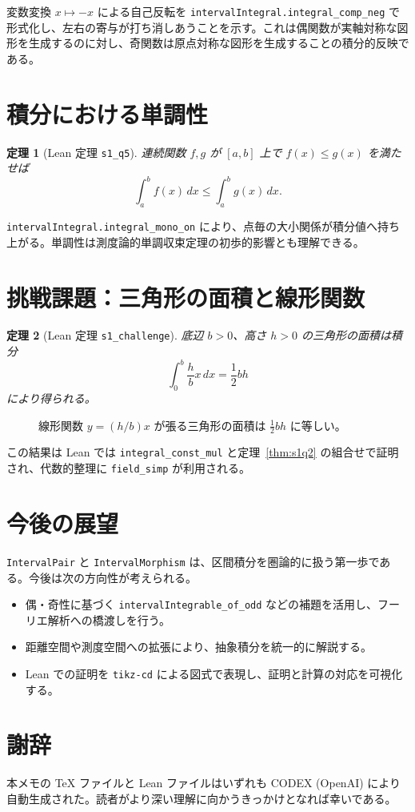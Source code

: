\documentclass[luatex]{ltjsarticle}
\theoremstyle{definition}
\theoremstyle{plain}
\newtheorem{theorem}{定理}
\theoremstyle{remark}
\begin{document}
変数変換 \(x\mapsto -x\) による自己反転を \verb|intervalIntegral.integral_comp_neg| で形式化し、左右の寄与が打ち消しあうことを示す。これは偶関数が実軸対称な図形を生成するのに対し、奇関数は原点対称な図形を生成することの積分的反映である。

\section{積分における単調性}
\begin{theorem}[Lean 定理 \texttt{s1\_q5}]
\label{thm:s1q5}
連続関数 \(f,g\) が \([a,b]\) 上で \(f(x)\le g(x)\) を満たせば
\[
\int_a^b f(x)\,dx \le \int_a^b g(x)\,dx.
\]
\end{theorem}

\verb|intervalIntegral.integral_mono_on| により、点毎の大小関係が積分値へ持ち上がる。単調性は測度論的単調収束定理の初歩的影響とも理解できる。

\section{挑戦課題：三角形の面積と線形関数}
\begin{theorem}[Lean 定理 \texttt{s1\_challenge}]
\label{thm:challenge}
底辺 \(b>0\)、高さ \(h>0\) の三角形の面積は積分
\[
\int_{0}^{b} \frac{h}{b}x\,dx = \frac{1}{2} b h
\]
により得られる。
\end{theorem}

\begin{figure}[h]
\centering
{}
\caption{線形関数 \(y=(h/b)x\) が張る三角形の面積は \(\tfrac{1}{2}bh\) に等しい。}
\end{figure}

この結果は Lean では \verb|integral_const_mul| と定理~\ref{thm:s1q2} の組合せで証明され、代数的整理に \verb|field_simp| が利用される。

\section{今後の展望}
\verb|IntervalPair| と \verb|IntervalMorphism| は、区間積分を圏論的に扱う第一歩である。今後は次の方向性が考えられる。
\begin{itemize}
  \item 偶・奇性に基づく \texttt{intervalIntegrable\_of\_odd} などの補題を活用し、フーリエ解析への橋渡しを行う。
  \item 距離空間や測度空間への拡張により、抽象積分を統一的に解説する。
  \item Lean での証明を \verb|tikz-cd| による図式で表現し、証明と計算の対応を可視化する。
\end{itemize}

\section*{謝辞}
本メモの TeX ファイルと Lean ファイルはいずれも CODEX (OpenAI) により自動生成された。読者がより深い理解に向かうきっかけとなれば幸いである。
\end{document}
